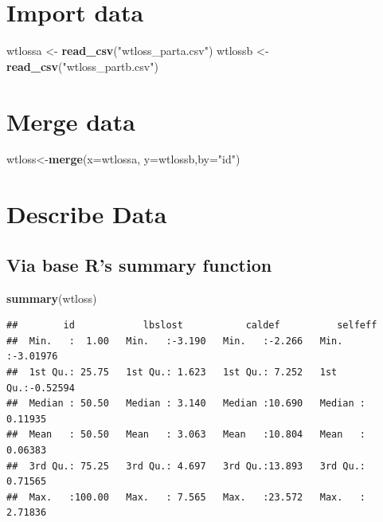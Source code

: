 \documentclass[]{article}
\newenvironment{Shaded}{\begin{snugshade}}{\end{snugshade}}
\newcommand{\KeywordTok}[1]{\textcolor[rgb]{0.13,0.29,0.53}{\textbf{#1}}}
\newcommand{\DataTypeTok}[1]{\textcolor[rgb]{0.13,0.29,0.53}{#1}}
\newcommand{\StringTok}[1]{\textcolor[rgb]{0.31,0.60,0.02}{#1}}
\newcommand{\NormalTok}[1]{#1}
\begin{document}
\section{Import data}\label{import-data}

\begin{Shaded}
\begin{Highlighting}[]
\NormalTok{wtlossa <-}\StringTok{ }\KeywordTok{read_csv}\NormalTok{(}\StringTok{"wtloss_parta.csv"}\NormalTok{)}
\NormalTok{wtlossb <-}\StringTok{ }\KeywordTok{read_csv}\NormalTok{(}\StringTok{"wtloss_partb.csv"}\NormalTok{)}
\end{Highlighting}
\end{Shaded}

\section{Merge data}\label{merge-data}

\begin{Shaded}
\begin{Highlighting}[]
\NormalTok{wtloss<-}\KeywordTok{merge}\NormalTok{(}\DataTypeTok{x=}\NormalTok{wtlossa, }\DataTypeTok{y=}\NormalTok{wtlossb,}\DataTypeTok{by=}\StringTok{"id"}\NormalTok{)}
\end{Highlighting}
\end{Shaded}

\section{Describe Data}\label{describe-data}

\subsection{Via base R's summary
function}\label{via-base-rs-summary-function}

\begin{Shaded}
\begin{Highlighting}[]
\KeywordTok{summary}\NormalTok{(wtloss)}
\end{Highlighting}
\end{Shaded}

\begin{verbatim}
##        id            lbslost           caldef          selfeff        
##  Min.   :  1.00   Min.   :-3.190   Min.   :-2.266   Min.   :-3.01976  
##  1st Qu.: 25.75   1st Qu.: 1.623   1st Qu.: 7.252   1st Qu.:-0.52594  
##  Median : 50.50   Median : 3.140   Median :10.690   Median : 0.11935  
##  Mean   : 50.50   Mean   : 3.063   Mean   :10.804   Mean   : 0.06383  
##  3rd Qu.: 75.25   3rd Qu.: 4.697   3rd Qu.:13.893   3rd Qu.: 0.71565  
##  Max.   :100.00   Max.   : 7.565   Max.   :23.572   Max.   : 2.71836
\end{verbatim}
\end{document}
